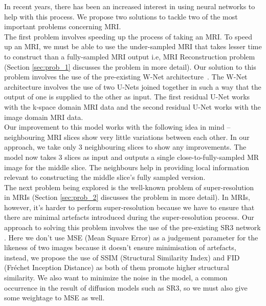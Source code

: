 In recent years, there has been an increased interest in using neural networks to help with this process. We propose two solutions to tackle two of the most important problems concerning MRI.\\

The first problem involves speeding up the process of taking an MRI. To speed up an MRI, we must be able to use the under-sampled MRI that takes lesser time to construct than a fully-sampled MRI output i.e, MRI Reconstruction problem (Section \ref{sec:prob_1} discusses the problem in more detail). Our solution to this problem involves the use of the pre-existing W-Net architecture~\cite{8919674}. The W-Net architecture involves the use of two U-Nets joined together in such a way that the output of one is supplied to the other as input. The first residual U-Net works with the k-space domain MRI data and the second residual U-Net works with the image domain MRI data.\\

Our improvement to this model works with the following idea in mind -- neighbouring MRI slices show very little variations between each other. In our approach, we take only 3 neighbouring slices to show any improvements. The model now takes 3 slices as input and outputs a single close-to-fully-sampled MR image for the middle slice. The neighbours help in providing local information relevant to constructing the middle slice's fully sampled version.\\

The next problem being explored is the well-known problem of super-resolution in MRIs (Section \ref{sec:prob_2} discusses the problem in more detail). In MRIs, however, it's harder to perform super-resolution because we have to ensure that there are minimal artefacts introduced during the super-resolution process. Our approach to solving this problem involves the use of the pre-existing SR3 network \cite{saharia2021image}. Here we don't use MSE (Mean Square Error) as a judgement parameter for the likeness of two images because it doesn't ensure minimisation of artefacts, instead, we propose the use of SSIM (Structural Similarity Index) \cite{1284395} and FID (Fréchet Inception Distance) \cite{fid, mathiasen2021backpropagating}  as both of them promote higher structural similarity. We also want to minimize the noise in the model, a common occurrence in the result of diffusion models such as SR3, so we must also give some weightage to MSE as well.\\

